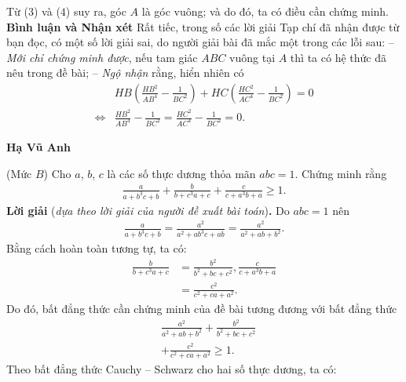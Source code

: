\begin{multicols}{2}
	\vskip 0.05cm
	Từ ($3$) và ($4$) suy ra, góc $A$ là góc vuông; và do đó, ta có điều cần chứng minh.
	\vskip 0.05cm
	\textbf{\color{thachthuctoanhoc}Bình luận và Nhận xét}
	\vskip 0.05cm
	Rất tiếc, trong số các lời giải Tạp chí đã nhận được từ bạn đọc, có một số lời giải sai, do người giải bài đã mắc một trong các lỗi sau:
	\vskip 0.05cm
	-- \textit{Mới chỉ chứng minh được}, nếu tam giác $ABC$ vuông tại $A$ thì ta có hệ thức đã nêu trong đề bài;
	\vskip 0.05cm
	-- \textit{Ngộ nhận} rằng, hiển nhiên có
	\begin{align*}
		&HB\!\left(\!\!\frac{{H{B^2}}}{{A{B^4}}} \!-\! \frac{1}{{B{C^2}}}\!\! \right)\!\!+\! HC \! \left( \!\!\frac{{H{C^2}}}{{A{C^4}}} \!-\! \frac{1}{{B{C^2}}} \!\!\right) \!\!=\! 0\\
		\Leftrightarrow &\frac{{H{B^2}}}{{A{B^4}}} - \frac{1}{{B{C^2}}} = \frac{{H{C^2}}}{{A{C^4}}} - \frac{1}{{B{C^2}}} = 0.
	\end{align*}
	\begin{flushright}
		\textbf{\color{thachthuctoanhoc}Hạ Vũ Anh}
	\end{flushright}
	{}
	(Mức $B$)
	Cho $a$, $b$, $c$ là các số thực dương thỏa mãn $abc = 1$. Chứng minh rằng
	\begin{align*}
		\frac{a}{{a + {b^3}c + b}} \!+\! \frac{b}{{b + {c^3}a + c}} \!+\! \frac{c}{{c + {a^3}b + a}} \!\ge\! 1.
	\end{align*}
	\textbf{\color{thachthuctoanhoc}Lời giải} (\textit{dựa theo lời giải của người đề xuất bài toán})\textbf{\color{thachthuctoanhoc}.}
	\vskip 0.05cm
	Do $abc = 1$ nên
	\begin{align*}
		\frac{a}{{a \!+\! {b^3}c \!+\! b}} \!=\! \frac{{{a^2}}}{{{a^2} \!+\! a{b^3}c \!+\! ab}} \!=\! \frac{{{a^2}}}{{{a^2} \!+\! ab \!+\! {b^2}}}.
	\end{align*}
	Bằng cách hoàn toàn tương tự, ta có:
	\begin{align*}
		\frac{b}{{b + {c^3}a + c}} &= \frac{{{b^2}}}{{{b^2} + bc + {c^2}}}, \frac{c}{{c + {a^3}b + a}} \\
		&= \frac{{{c^2}}}{{{c^2} + ca + {a^2}}}.
	\end{align*}
	Do đó, bất đẳng thức cần chứng minh của đề bài tương đương với bất đẳng thức
	\begin{align*}
		&\frac{{{a^2}}}{{{a^2} + ab + {b^2}}} + \frac{{{b^2}}}{{{b^2} + bc + {c^2}}} \\
		&+ \frac{{{c^2}}}{{{c^2} + ca + {a^2}}} \ge 1. \tag{$1$}
	\end{align*}
	Theo bất đẳng thức Cauchy -- Schwarz cho hai số thực dương, ta có:

\end{multicols}
